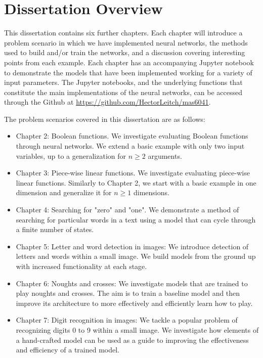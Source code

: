 \documentclass{somasmsc}
\begin{document}
\section{Dissertation Overview}

This dissertation contains six further chapters. Each chapter will introduce a problem scenario in which we have implemented neural networks, the methods used to build and/or train the networks, and a discussion covering interesting points from each example. Each chapter has an accompanying Jupyter notebook to demonstrate the models that have been implemented working for a variety of input parameters. The Jupyter notebooks, and the underlying functions that constitute the main implementations of the neural networks, can be accessed through the Github at \url{https://github.com/HectorLeitch/mas6041}.

The problem scenarios covered in this dissertation are as follows:
\begin{itemize}
    \item Chapter 2: Boolean functions. We investigate evaluating Boolean functions through neural networks. We extend a basic example with only two input variables, up to a generalization for $n \geq 2$ arguments.
    \item Chapter 3: Piece-wise linear functions. We investigate evaluating piece-wise linear functions. Similarly to Chapter 2, we start with a basic example in one dimension and generalize it for $n \geq 1$ dimensions.
    \item Chapter 4: Searching for "zero" and "one". We demonstrate a method of searching for particular words in a text using a model that can cycle through a finite number of states.
    \item Chapter 5: Letter and word detection in images: We introduce detection of letters and words within a small image. We build models from the ground up with increased functionality at each stage.
    \item Chapter 6: Noughts and crosses: We investigate models that are trained to play noughts and crosses. The aim is to train a baseline model and then improve its architecture to more effectively and efficiently learn how to play.
    \item Chapter 7: Digit recognition in images: We tackle a popular problem of recognizing digits 0 to 9 within a small image. We investigate how elements of a hand-crafted model can be used as a guide to improving the effectiveness and efficiency of a trained model.
\end{itemize}
\end{document}
